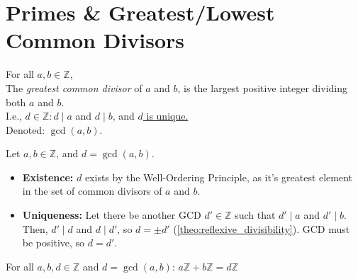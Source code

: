 \newpage
\section{Primes \& Greatest/Lowest Common Divisors}

\begin{Def}

    \label{def:gcd}

    For all $a,b\in\mathbb{Z}$,\\
    The \textit{greatest common divisor} of $a$ and $b$, is the largest positive integer dividing both $a$ and $b$.\\
    I.e., $d\in\mathbb{Z}: d\mid a$ and $d\mid b$, and \underline{$d$ is unique.}\\

    \noindent
    Denoted: $\gcd(a,b)$.
\end{Def}

\begin{Proof}

    \label{theo:gcd_existence_uniqueness}

    Let $a,b\in\mathbb{Z}$, and $d=\gcd(a,b)$.
    \begin{itemize}
        \item  \textbf{Existence:} $d$ exists by the Well-Ordering Principle, 
        as it's greatest element in the set of common divisors of $a$ and $b$.
        \item \textbf{Uniqueness:} Let there be another GCD $d'\in\mathbb{Z}$ such that $d'\mid a$ and $d'\mid b$.\\
        Then, $d'\mid d$ and $d\mid d'$, so $d=\pm d'$ (\ref{theo:reflexive_divisibility}). GCD must be positive, so $d=d'$.
    \end{itemize}

   

\end{Proof}

\begin{theo}

    \label{theo:gcd_ideal_linear_combination}

    For all \(a, b,d \in \mathbb{Z}\) and $d=\gcd(a,b)$: \(a\mathbb{Z} + b\mathbb{Z} = d\mathbb{Z}\)

\end{theo}

